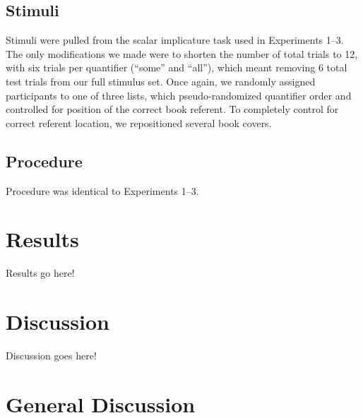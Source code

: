 \documentclass[man]{apa2}
\begin{document}
{\subsection{Stimuli}
Stimuli were pulled from the scalar implicature task used in Experiments 1--3. The only modifications we made were to shorten the number of total trials to 12, with six trials per quantifier (``some'' and ``all''), which meant removing 6 total test trials from our full stimulus set. Once again, we randomly assigned participants to one of three lists, which pseudo-randomized quantifier order and controlled for position of the correct book referent. To completely control for correct referent location, we repositioned several book covers. 

\subsection{Procedure}
Procedure was identical to Experiments 1--3. 

\section{Results}
Results go here!

\section{Discussion}
Discussion goes here!

\section{General Discussion}


}
\end{document}
